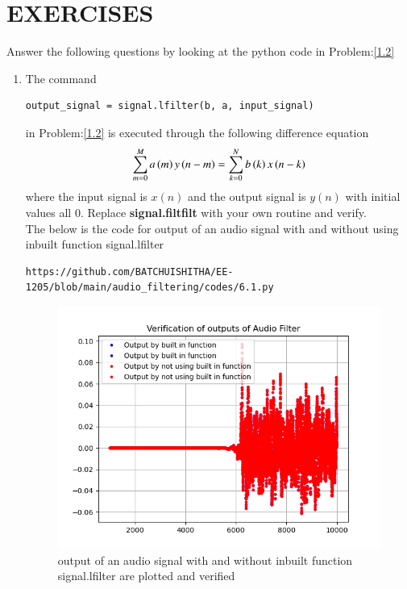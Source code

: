 \documentclass[journal,12pt,twocolumn]{IEEEtran}
\theoremstyle{remark}
\begin{document}
\section{EXERCISES}
Answer the following questions by looking at the python code in Problem:\eqref{1.2}
\begin{enumerate}[label=\thesection.\arabic*]
\item The command
\begin{lstlisting}
output_signal = signal.lfilter(b, a, input_signal)
\end{lstlisting}
in Problem:\eqref{1.2}  is executed through the following difference equation
\begin{equation}
 \sum _{m=0}^{M}a\left(m\right)y\left(n-m\right)=\sum _{k=0}^{N}b\left(k\right)x\left(n-k\right) \label{7.1}
\end{equation}
where the input signal is $x(n)$ and the output signal is $y(n)$ with initial values all 0. Replace
\textbf{signal.filtfilt} with your own routine and verify.\\
\solution The below is the code for output of an audio signal with and without using inbuilt function signal.lfilter\\
\begin{lstlisting}
https://github.com/BATCHUISHITHA/EE-1205/blob/main/audio_filtering/codes/6.1.py
\end{lstlisting}
\begin{figure}[ht]
	\centering
	\includegraphics[width=\columnwidth]{figs/6.1.png}
	\caption{output of an audio signal with and without inbuilt function signal.lfilter are plotted and verified}
	\label{fig:6.1}
\end{figure}

\end{enumerate}
\end{document}
